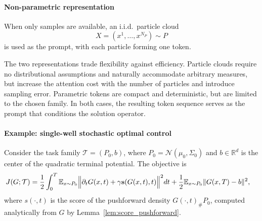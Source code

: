 \documentclass[preprint]{elsarticle}
\newcommand{\R}{\mathbb{R}}
\newcommand{\E}{\mathbb{E}}
\newcommand{\sT}{\mathcal{T}}
\begin{document}
\paragraph{Non-parametric representation} 
When only samples are available, an i.i.d.\ particle cloud
\[
X=(x^1,\ldots,x^{N_P})\sim P
\]
is used as the prompt, with each particle forming one token.

The two representations trade flexibility against efficiency. Particle clouds require no distributional assumptions and naturally accommodate arbitrary measures, but increase the attention cost with the number of particles and introduce sampling error. Parametric tokens are compact and deterministic, but are limited to the chosen family. In both cases, the resulting token sequence serves as the prompt that conditions the solution operator.


\paragraph{Example: single-well stochastic optimal control}
Consider the task family $\sT=(P_0,b)$, where $P_0=\mathcal N(\mu_0,\Sigma_0)$ and $b\in\R^d$ is the center of the quadratic terminal potential. The objective is
\begin{align}
J(G;\sT)
&=
\frac12
\int_0^T
\E_{x\sim P_0}
\Bigl\|
\partial_tG(x,t)+\gamma \mathbf{s}(G(x,t),t)
\Bigr\|^2dt
+
\frac12
\E_{x\sim P_0}
\|G(x,T)-b\|^2,
\label{equ:soc_functional}
\end{align}
where $s(\cdot,t)$ is the score of the pushforward density $G(\cdot,t)_\#P_0$, computed analytically from $G$ by Lemma~\ref{lem:score_pushforward}.
\end{document}

